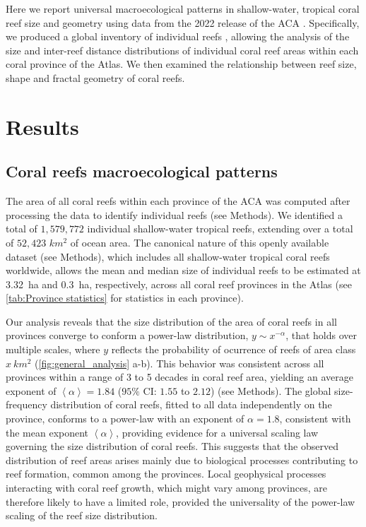 Here we report universal macroecological patterns
\cite{Brown1995Macroecology} in shallow-water, tropical coral reef size and
geometry using data from the 2022 release of the ACA \cite{allen-coral-atlas}.
Specifically, we produced a global inventory of individual reefs
\cite{gimenez_romero_2023_10025083}, allowing the analysis of the size and
inter-reef distance distributions of individual coral reef areas within each
coral province of the Atlas. We then examined the relationship between reef
size, shape and fractal geometry of coral reefs.

\section{Results}
\subsection{Coral reefs macroecological patterns}

The area of all coral reefs within each province of the ACA was computed
after processing the data to identify individual reefs (see Methods). We
identified a total of $1,579,772$ individual shallow-water tropical reefs,
extending over a total of $52,423$ $km^2$ of ocean area. The canonical nature
of this openly available dataset (see Methods), which includes all
shallow-water tropical coral reefs worldwide, allows the mean and median size
of individual reefs to be estimated at \SI{3.32}{ha} and \SI{0.3}{ha},
respectively, across all coral reef provinces in the Atlas (see
\cref{tab:Province statistics} for statistics in each province).

Our analysis reveals that the size distribution of the area of coral reefs
in all provinces converge to conform a power-law distribution, $y\sim
    x^{-\alpha}$, that holds over multiple scales, where $y$ reflects the
probability of ocurrence of reefs of area class $x \ km^2$
(\cref{fig:general_analysis} a-b). This behavior was consistent across all
provinces within a range of 3 to 5 decades in coral reef area, yielding an
average exponent of $\left<\alpha\right>=1.84$ ($95\%$ CI: $1.55$ to $2.12$)
(see Methods). The global size-frequency distribution of coral reefs, fitted to
all data independently on the province, conforms to a power-law with an
exponent of $\alpha=1.8$, consistent with the mean exponent
$\left<\alpha\right>$, providing evidence for a universal scaling law governing
the size distribution of coral reefs. This suggests that the observed
distribution of reef areas arises mainly due to biological processes
contributing to reef formation, common among the provinces. Local geophysical
processes interacting with coral reef growth, which might vary among provinces,
are therefore likely to have a limited role, provided the universality of the
power-law scaling of the reef size distribution.

